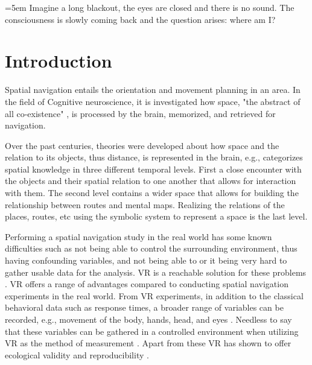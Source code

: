 \markboth{}{}

\begin{minipage}[l]{80mm}
	\vspace{120pt} 
	\leftskip=5em
	Imagine a long blackout, the eyes are closed and there is no sound. The consciousness is slowly coming back and the question arises: where am I?\\
\end{minipage}


\vspace{20pt}


\chapter{Introduction}


Spatial navigation entails the orientation and movement planning in an area. In the field of Cognitive neuroscience, it is investigated how space, "the abstract of all co-existence" \autocite{spencer1989}, is processed by the brain, memorized, and retrieved for navigation. 

Over the past centuries, theories were developed about how space and the relation to its objects, thus distance, is represented in the brain, e.g., \textcite{cassirer1955philosophy} categorizes spatial knowledge in three different temporal levels. First a close encounter with the objects and their spatial relation to one another that allows for interaction with them. The second level contains a wider space that allows for building the relationship between routes and mental maps. Realizing the relations of the places, routes, etc using the symbolic system to represent a space is the last level. 

Performing a spatial navigation study in the real world has some known difficulties such as not being able to control the surrounding environment, thus having confounding variables, and not being able to or it being very hard to gather usable data for the analysis. VR is a reachable solution for these problems \autocite{diersch2019potential}. VR offers a range of advantages compared to conducting spatial navigation experiments in the real world. From VR experiments, in addition to the classical behavioral data such as response times, a broader range of variables can be recorded, e.g., movement of the body, hands, head, and eyes \autocite{pan2018and}. Needless to say that these variables can be gathered in a controlled environment when utilizing VR as the method of measurement \autocite{mcilvenny2020future}. Apart from these VR has shown to offer ecological validity \autocite{pan2018and, chicchi2017novel} and reproducibility \autocite{pan2018and}.

